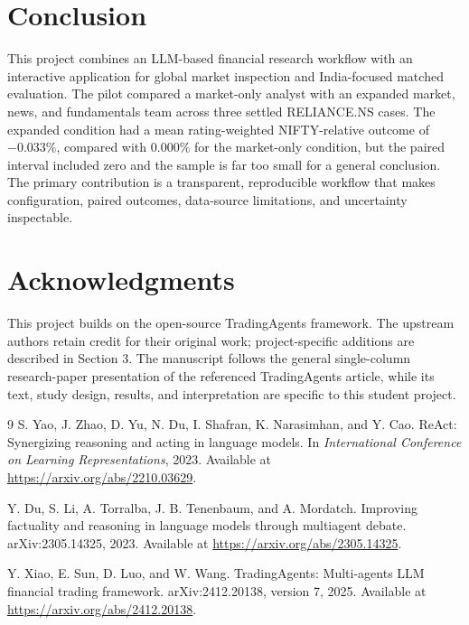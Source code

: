 \documentclass[10pt]{article}
\begin{document}
\section{Conclusion}
This project combines an LLM-based financial research workflow with an interactive application for global market inspection and India-focused matched evaluation. The pilot compared a market-only analyst with an expanded market, news, and fundamentals team across three settled RELIANCE.NS cases. The expanded condition had a mean rating-weighted NIFTY-relative outcome of $-0.033\%$, compared with $0.000\%$ for the market-only condition, but the paired interval included zero and the sample is far too small for a general conclusion. The primary contribution is a transparent, reproducible workflow that makes configuration, paired outcomes, data-source limitations, and uncertainty inspectable.

\section*{Acknowledgments}
This project builds on the open-source TradingAgents framework. The upstream authors retain credit for their original work; project-specific additions are described in Section 3. The manuscript follows the general single-column research-paper presentation of the referenced TradingAgents article, while its text, study design, results, and interpretation are specific to this student project.

\begin{thebibliography}{9}
S. Yao, J. Zhao, D. Yu, N. Du, I. Shafran, K. Narasimhan, and Y. Cao.
\newblock ReAct: Synergizing reasoning and acting in language models.
\newblock In \emph{International Conference on Learning Representations}, 2023.
\newblock Available at \url{https://arxiv.org/abs/2210.03629}.

Y. Du, S. Li, A. Torralba, J. B. Tenenbaum, and A. Mordatch.
\newblock Improving factuality and reasoning in language models through multiagent debate.
\newblock arXiv:2305.14325, 2023.
\newblock Available at \url{https://arxiv.org/abs/2305.14325}.

Y. Xiao, E. Sun, D. Luo, and W. Wang.
\newblock TradingAgents: Multi-agents LLM financial trading framework.
\newblock arXiv:2412.20138, version 7, 2025.
\newblock Available at \url{https://arxiv.org/abs/2412.20138}.
\end{thebibliography}
\end{document}
